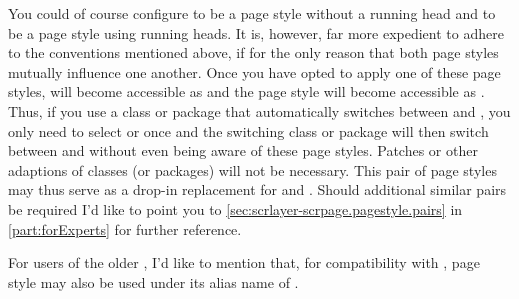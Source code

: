 You could of course configure  to be a page style
without a running head and  to be a page style
using running heads. It is, however, far more expedient to adhere to the
conventions mentioned above, if for the only reason that both page styles
mutually influence one another.  Once you have opted to apply one of these
page styles,  will become accessible as
 and the page style  will
become accessible as . Thus, if you use a class or package
that automatically switches between  and
, you only need to select  or
 once and the switching class or package will
then switch between  and 
without even being aware of these page styles. Patches or other adaptions of
classes (or packages) will not be necessary. This pair of page styles may thus
serve as a drop-in replacement for  and .
Should additional similar pairs be required I'd like to point you to
\autoref{sec:scrlayer-scrpage.pagestyle.pairs} in \autoref{part:forExperts}
for further reference.

For users of the older , I'd like to mention that, for
compatibility with , page style
 may also be used under its alias name of
.%
%
%
%

